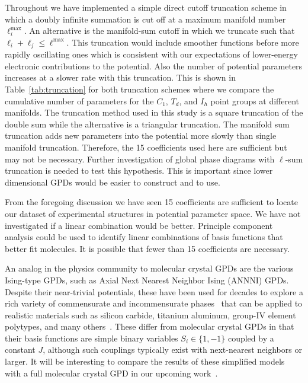 \documentclass[preprint]{iucr}              %
\begin{document}
Throughout we have implemented a simple direct cutoff truncation
scheme in which a doubly infinite summation is cut off at a maximum
manifold number $\ell_i^\mathrm{max}$.  An alternative is the
manifold-sum cutoff in which we truncate such that $\ell_i+\ell_j\le
\ell^\mathrm{max}$. This truncation would include smoother functions
before more rapidly oscillating ones which is consistent with our
expectations of lower-energy electronic contributions to the
potential. Also the number of potential parameters increases at a
slower rate with this truncation. This is shown in
Table~\ref{tab:truncation} for both truncation schemes where we
compare the cumulative number of parameters for the $C_1$, $T_d$,
and $I_h$ point groups at different manifolds. The truncation method
used in this study is a square truncation of the double sum while
the alternative is a triangular truncation. The manifold sum
truncation adds new parameters into the potential more slowly than
single manifold truncation. Therefore, the 15 coefficients used here
are sufficient but may not be necessary. Further investigation of
global phase diagrams with $\ell$-sum truncation is needed to test
this hypothesis. This is important since lower dimensional GPDs
would be easier to construct and to use.

From the foregoing discussion we have seen 15 coefficients are
sufficient to locate our dataset of experimental
structures in potential parameter space.  We have not investigated if a linear
combination would be better.  Principle component analysis could be used to
identify linear combinations of basis functions that better fit molecules. It
is possible that fewer than 15 coefficients are necessary. 

An analog in the physics community to molecular crystal GPDs are the various
Ising-type GPDs, such as Axial Next Nearest Neighbor Ising (ANNNI) GPDs. 
Despite their near-trivial potentials, these have been used for decades
to explore a rich variety of commensurate and incommensurate
phases~\cite{Gendiar05,Kasama06,Muraoka99,Sato99,Kim95} that can be applied to
realistic materials such as silicon carbide, titanium aluminum, group-IV
element polytypes, and many others~\cite{Wong-Leung05,Colinet02,Raffy02}. These
differ from molecular crystal GPDs in that their basis functions are simple binary
variables $S_i\in \{1,-1\}$ coupled by a constant $J$, although such couplings
typically exist with next-nearest neighbors or larger. It will be
interesting to compare the results of these simplified models with a full
molecular crystal GPD in our upcoming work~\cite{Keith09b}.
\end{document}
